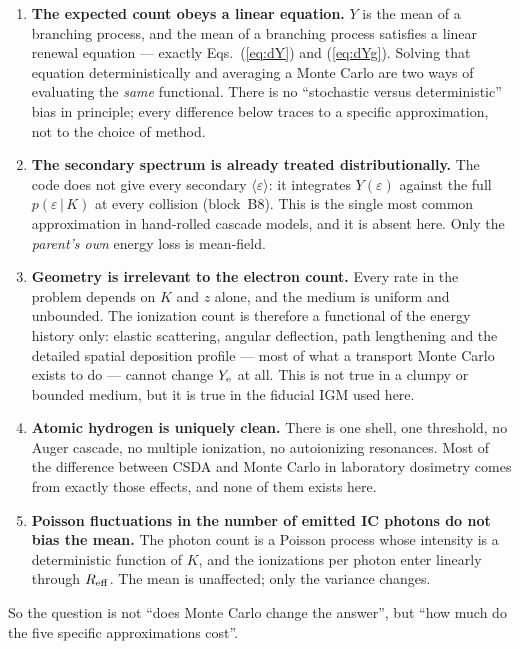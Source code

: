 \documentclass[11pt,a4paper]{article}
\newcommand{\eps}{\varepsilon}
\begin{document}
\begin{enumerate}[leftmargin=1.6em]
\item \textbf{The expected count obeys a linear equation.}  $Y$ is the mean of a
      branching process, and the mean of a branching process satisfies a linear
      renewal equation --- exactly Eqs.~(\ref{eq:dY}) and (\ref{eq:dYg}).
      Solving that equation deterministically and averaging a Monte Carlo are
      two ways of evaluating the \emph{same} functional.  There is no
      ``stochastic versus deterministic'' bias in principle; every difference
      below traces to a specific approximation, not to the choice of method.
\item \textbf{The secondary spectrum is already treated distributionally.}  The
      code does not give every secondary $\langle\eps\rangle$: it integrates
      $Y(\eps)$ against the full $p(\eps\,|\,K)$ at every collision
      (block~B8).  This is the single most common approximation in
      hand-rolled cascade models, and it is absent here.  Only the
      \emph{parent's own} energy loss is mean-field.
\item \textbf{Geometry is irrelevant to the electron count.}  Every rate in the
      problem depends on $K$ and $z$ alone, and the medium is uniform and
      unbounded.  The ionization count is therefore a functional of the energy
      history only: elastic scattering, angular deflection, path lengthening
      and the detailed spatial deposition profile --- most of what a transport
      Monte Carlo exists to do --- cannot change $Y_{\rm e}$ at all.  This is
      not true in a clumpy or bounded medium, but it is true in the fiducial
      IGM used here.
\item \textbf{Atomic hydrogen is uniquely clean.}  There is one shell, one
      threshold, no Auger cascade, no multiple ionization, no autoionizing
      resonances.  Most of the difference between CSDA and Monte Carlo in
      laboratory dosimetry comes from exactly those effects, and none of them
      exists here.
\item \textbf{Poisson fluctuations in the number of emitted IC photons do not
      bias the mean.}  The photon count is a Poisson process whose intensity is
      a deterministic function of $K$, and the ionizations per photon enter
      linearly through $R_{\rm eff}$.  The mean is unaffected; only the variance
      changes.
\end{enumerate}

So the question is not ``does Monte Carlo change the answer'', but ``how much
do the five specific approximations cost''.
\end{document}

